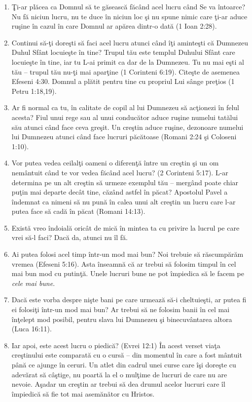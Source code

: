 \begin{enumerate}
	\item Ţi-ar plăcea ca Domnul să te găsească făcând acel lucru când Se va întoarce? Nu fă niciun lucru, nu te duce în niciun loc şi nu spune nimic care ţi-ar aduce ruşine în cazul în care Domnul ar apărea dintr-o dată (1 Ioan 2:28).
	
	\item Continui să-ţi doreşti să faci acel lucru atunci când îţi aminteşti că Dumnezeu Duhul Sfânt locuieşte în tine? Trupul tău este templul Duhului Sfânt care locuieşte în tine, iar tu L-ai primit ca dar de la Dumnezeu. Tu nu mai eşti al tău – trupul tău nu-ţi mai aparţine (1 Corinteni 6:19). Citeşte de asemenea Efeseni 4:30. Domnul a plătit pentru tine cu propriul Lui sânge preţios (1 Petru 1:18,19).
	
	\item Ar fi normal ca tu, în calitate de copil al lui Dumnezeu să acţionezi în felul acesta? Fiul unui rege sau al unui conducător aduce ruşine numelui tatălui său atunci când face ceva greşit. Un creştin aduce ruşine, dezonoare numelui lui Dumnezeu atunci când face lucruri păcătoase (Romani 2:24 şi Coloseni 1:10).
	
	\item Vor putea vedea ceilalţi oameni o diferenţă între un creştin şi un om nemântuit când te vor vedea făcând acel lucru? (2 Corinteni 5:17). L-ar determina pe un alt creştin să urmeze exemplul tău – mergând poate chiar puţin mai departe decât tine, căzând astfel în păcat? Apostolul Pavel a îndemnat ca nimeni să nu pună în calea unui alt creştin un lucru care l-ar putea face să cadă în păcat (Romani 14:13).
	
	\item Există vreo îndoială oricât de mică în mintea ta cu privire la lucrul pe care vrei să-l faci? Dacă da, atunci nu îl fă.
	
	\item Ai putea folosi acel timp într-un mod mai bun? Noi trebuie să răscumpărăm vremea (Efeseni 5:16). Asta înseamnă că ar trebui să folosim timpul în cel mai bun mod cu putinţă. Unele lucruri bune ne pot împiedica să le facem pe \textit{cele mai bune}.
	
	\item Dacă este vorba despre nişte bani pe care urmează să-i cheltuieşti, ar putea fi ei folosiţi într-un mod mai bun? Ar trebui să ne folosim banii în cel mai înţelept mod posibil, pentru slava lui Dumnezeu şi binecuvântarea altora (Luca 16:11).
	
	\item Iar apoi, este acest lucru o piedică? (Evrei 12:1) În acest verset viaţa creştinului este comparată cu o cursă – din momentul în care a fost mântuit până ce ajunge în ceruri. Un atlet din cadrul unei curse care îşi doreşte cu adevărat să câştige, nu poartă la el o mulţime de lucruri de care nu are nevoie. Aşadar un creştin ar trebui să dea drumul acelor lucruri care îl împiedică să fie tot mai asemănător cu Hristos.
	
\end{enumerate}


